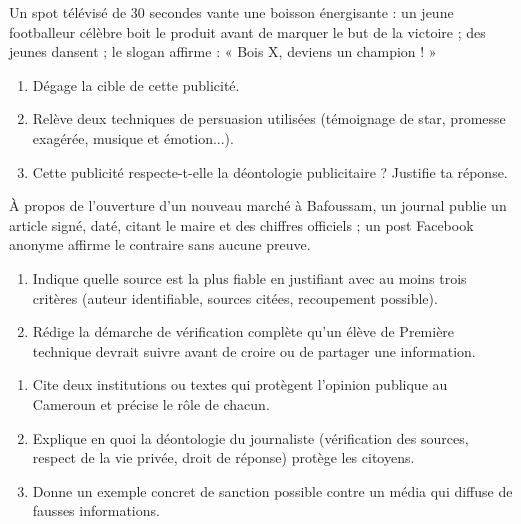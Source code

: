 \documentclass[11pt]{article}
\newcounter{popsec}
\newcounter{popsub}
\newcommand{\courssub}[1]{%
  \stepcounter{popsub}%
  \par\vspace{9pt}\noindent{\popxbold\fontsize{11.5}{13}\selectfont\color{popink}{\color{poporange}\thepopsec.\thepopsub}\hspace{6pt}#1}\par\nopagebreak\vspace{4pt}
}
\begin{document}
\begin{exercice}
Un spot télévisé de 30 secondes vante une boisson énergisante : un jeune footballeur célèbre boit le produit avant de marquer le but de la victoire ; des jeunes dansent ; le slogan affirme : « Bois X, deviens un champion ! »
\begin{enumerate}
\item Dégage la cible de cette publicité.
\item Relève deux techniques de persuasion utilisées (témoignage de star, promesse exagérée, musique et émotion...).
\item Cette publicité respecte-t-elle la déontologie publicitaire ? Justifie ta réponse.
\end{enumerate}
\end{exercice}

\begin{exercice}
À propos de l'ouverture d'un nouveau marché à Bafoussam, un journal publie un article signé, daté, citant le maire et des chiffres officiels ; un post Facebook anonyme affirme le contraire sans aucune preuve.
\begin{enumerate}
\item Indique quelle source est la plus fiable en justifiant avec au moins trois critères (auteur identifiable, sources citées, recoupement possible).
\item Rédige la démarche de vérification complète qu'un élève de Première technique devrait suivre avant de croire ou de partager une information.
\end{enumerate}
\end{exercice}

\begin{exercice}
\begin{enumerate}
\item Cite deux institutions ou textes qui protègent l'opinion publique au Cameroun et précise le rôle de chacun.
\item Explique en quoi la déontologie du journaliste (vérification des sources, respect de la vie privée, droit de réponse) protège les citoyens.
\item Donne un exemple concret de sanction possible contre un média qui diffuse de fausses informations.
\end{enumerate}
\end{exercice}

\courssub{Je me prépare au Bac}
\end{document}
